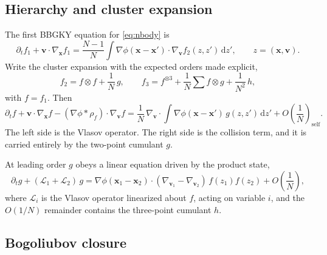 \documentclass[11pt]{article}
\newcommand{\dd}{\mathrm{d}}
\newcommand{\bx}{\mathbf{x}}
\newcommand{\bv}{\mathbf{v}}
\theoremstyle{definition}
\begin{document}
\subsection{Hierarchy and cluster expansion}

The first BBGKY equation for \eqref{eq:nbody} is
\begin{equation}
  \partial_t f_1 + \bv\cdot\nabla_{\bx} f_1
  = \frac{N-1}{N}\int \nabla\phi(\bx - \bx')\cdot\nabla_{\bv}
    f_2(z, z')\,\dd z', \qquad z = (\bx,\bv).
\end{equation}
Write the cluster expansion with the expected orders made explicit,
\begin{equation}
  f_2 = f\otimes f + \frac{1}{N}\,g, \qquad
  f_3 = f^{\otimes 3} + \frac{1}{N}\sum f\otimes g + \frac{1}{N^2}\,h ,
\end{equation}
with $f = f_1$. Then
\begin{equation}
  \partial_t f + \bv\cdot\nabla_{\bx} f
  - (\nabla\phi * \rho_f)\cdot\nabla_{\bv} f
  = \frac{1}{N}\,\nabla_{\bv}\cdot\!\int \nabla\phi(\bx-\bx')\,
    g(z,z')\,\dd z' + O\!\left(\frac{1}{N}\right)_{\text{self}} .
  \label{eq:f1}
\end{equation}
The left side is the Vlasov operator. The right side is the collision term,
and it is carried entirely by the two-point cumulant $g$.

At leading order $g$ obeys a linear equation driven by the product state,
\begin{equation}
  \partial_t g + (\mathcal{L}_1 + \mathcal{L}_2)\,g
  = \nabla\phi(\bx_1 - \bx_2)\cdot(\nabla_{\bv_1} - \nabla_{\bv_2})
    \,f(z_1) f(z_2) + O\!\left(\frac{1}{N}\right),
  \label{eq:g}
\end{equation}
where $\mathcal{L}_i$ is the Vlasov operator linearized about $f$, acting on
variable $i$, and the $O(1/N)$ remainder contains the three-point cumulant
$h$.

\subsection{Bogoliubov closure}
\end{document}

